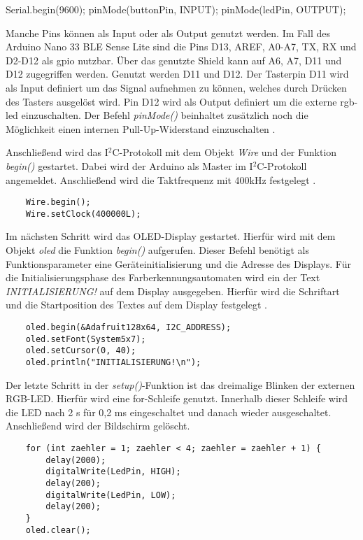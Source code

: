 \begin{Arduino}		
    Serial.begin(9600);
    pinMode(buttonPin, INPUT);
    pinMode(ledPin, OUTPUT);
\end{Arduino}

Manche Pins können als Input oder als Output genutzt werden. Im Fall des Arduino Nano 33 BLE Sense Lite sind die Pins D13, AREF, A0-A7, TX, RX und D2-D12 als \ac{gpio} nutzbar. Über das genutzte Shield kann auf A6, A7, D11 und D12 zugegriffen werden. Genutzt werden D11 und D12. Der Tasterpin D11 wird als Input definiert um das Signal aufnehmen zu können, welches durch Drücken des Tasters ausgelöst wird. Pin D12 wird als Output definiert um die externe \ac{rgb}-\ac{led} einzuschalten. Der Befehl \textit{pinMode()} beinhaltet zusätzlich noch die Möglichkeit einen internen Pull-Up-Widerstand einzuschalten \cite{ArduinoPinMode:2019}. 



Anschließend wird das I$^2$C-Protokoll mit dem Objekt \textit{Wire} und der Funktion \textit{begin()} gestartet. Dabei wird der Arduino als Master im I$^2$C-Protokoll angemeldet\cite{ArduinoWire:2022}. Anschließend wird die Taktfrequenz mit 400kHz festgelegt \cite{ArduinoWireClock:2022}.

\begin{lstlisting}		
    Wire.begin();
    Wire.setClock(400000L);
\end{lstlisting}

Im nächsten Schritt wird das OLED-Display gestartet. Hierfür wird mit dem Objekt \textit{oled} die Funktion \textit{begin()} aufgerufen. Dieser Befehl benötigt als Funktionsparameter eine Geräteinitialisierung und die Adresse des Displays. Für die Initialisierungsphase des Farberkennungsautomaten wird ein der Text \textit{INITIALISIERUNG!} auf dem Display ausgegeben. Hierfür wird die Schriftart und die Startposition des Textes auf dem Display festgelegt \cite{ArduinoSSD:2023}.

\begin{lstlisting}		
    oled.begin(&Adafruit128x64, I2C_ADDRESS);
    oled.setFont(System5x7);
    oled.setCursor(0, 40);
    oled.println("INITIALISIERUNG!\n");
\end{lstlisting}
Der letzte Schritt in der \textit{setup()}-Funktion ist das dreimalige Blinken der externen RGB-LED. Hierfür wird eine for-Schleife genutzt. Innerhalb dieser Schleife wird die LED nach 2 s für 0,2 ms eingeschaltet und danach wieder ausgeschaltet. Anschließend wird der Bildschirm gelöscht.

\begin{lstlisting}
    for (int zaehler = 1; zaehler < 4; zaehler = zaehler + 1) {
        delay(2000);
        digitalWrite(LedPin, HIGH);
        delay(200);
        digitalWrite(LedPin, LOW);
        delay(200);
    }
    oled.clear();
\end{lstlisting}


